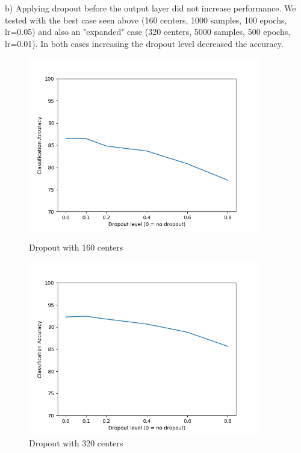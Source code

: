 \documentclass[11pt]{article}
\begin{document}
\begin{enumerate}
b) Applying dropout before the output layer did not increase performance. We tested with the best case seen above (160 centers, 1000 samples, 100 epochs, lr=0.05) and also an "expanded" case (320 centers, 5000 samples, 500 epochs, lr=0.01). In both cases increasing the dropout level decreased the accuracy.
\begin{figure}[h!]
    \centering
    \begin{minipage}{0.45\textwidth}
    	\centering
        \includegraphics[width=0.9\textwidth]{q2_dropout1}
        \caption{Dropout with 160 centers}
    \end{minipage}\hfill
    \begin{minipage}{0.45\textwidth}
    	\centering
         \includegraphics[width=0.9\textwidth]{q2_dropout2}
         \caption{Dropout with 320 centers}
    \end{minipage}\hfill
\end{figure}




\end{enumerate}
\end{document}

